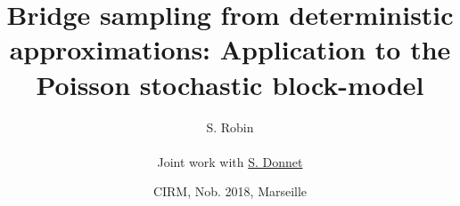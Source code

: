 \documentclass[9pt]{beamer}
\newcommand{\fignet}{/home/robin/RECHERCHE/RESEAUX/EXPOSES/FIGURES}
\begin{document}

\title[Bridge sampling for Poisson SBM]{Bridge sampling from deterministic approximations:  Application to the Poisson stochastic block-model}

\author[S. Robin]{S. Robin \\ ~\\
    Joint work with \underline{S. Donnet}
  }


\date[November 2018, Marseille]{CIRM, Nob. 2018, Marseille}

\maketitle

\end{document}
